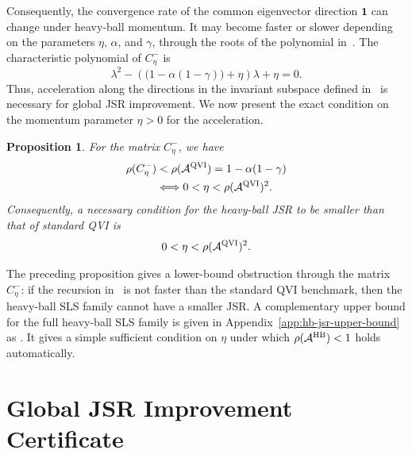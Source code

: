 \documentclass[letterpaper]{article}
\numberwithin{equation}{section}
\newtheorem{proposition}{Proposition}[section]
\begin{document}
Consequently, the convergence rate of the common eigenvector direction $\mathbf{1}$ can change under
heavy-ball momentum. It may become faster or slower depending on the parameters
$\eta$, $\alpha$, and $\gamma$, through the roots of the polynomial
in~. The characteristic polynomial of $C_\eta^-$ is
\begin{equation}
  \lambda^2-(\bigl(1-\alpha(1-\gamma)\bigr)+\eta)\lambda+\eta=0.
  \label{eq:hb-common-eigenvector-poly}
\end{equation}
Thus, acceleration along the directions in the invariant subspace defined in~ is necessary for global JSR improvement.
We now present the exact condition on the momentum parameter $\eta>0$ for the acceleration.
\begin{proposition}
\label{prop:common_eigenvector_acceleration}
For the matrix $C_\eta^-$, we have
\begin{align*}
\rho(C_\eta^-)&<\rho(\mathcal A^{\rm QVI})=1-\alpha(1-\gamma)\\
&\Longleftrightarrow 0<\eta<\rho(\mathcal A^{\rm QVI})^2.
\end{align*}
Consequently, a necessary condition for the heavy-ball JSR to be smaller than
that of standard QVI is
\begin{align*}
  0<\eta<\rho(\mathcal A^{\rm QVI})^2.
\end{align*}
\end{proposition}


The preceding proposition gives a lower-bound obstruction through the matrix $C_\eta^-$: if the recursion in~ is not faster than the standard QVI benchmark, then the heavy-ball SLS family cannot have a smaller JSR. A complementary upper bound for the full heavy-ball SLS family is given in Appendix~\ref{app:hb-jsr-upper-bound} as . It gives a simple sufficient condition on $\eta$ under which $\rho(\mathcal A^{\rm HB})<1$ holds automatically.


\section{Global JSR Improvement Certificate}
\label{sec:global_jsr_improvement}
\end{document}
